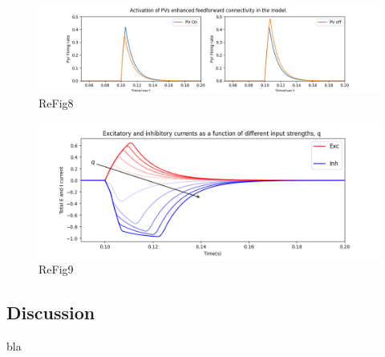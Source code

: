\begin{figure}
 \includegraphics[width=\textwidth]{Figures/Fig8BD}
 \caption{ReFig8}
\end{figure}

\begin{figure}
 \includegraphics[width=\textwidth]{Figures/Fig9}
 \caption{ReFig9}
\end{figure}

 



\FloatBarrier
\subsection{Discussion}
bla

